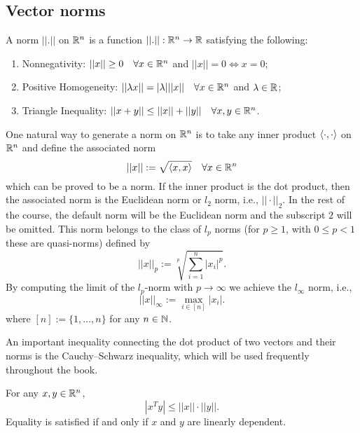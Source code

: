 \documentclass[10pt,a4paper]{article}
\begin{document}
\subsection{Vector norms}
\begin{definition}
	A norm $||.||$ on $\mathbb{R}^n$ is a function $||.||:\mathbb{R}^n \to \mathbb{R}$ satisfying the following:
	\begin{enumerate}
		\item Nonnegativity: $||x|| \geq 0 \quad \forall x \in \mathbb{R}^n$ and $||x|| = 0 \Leftrightarrow x =0$;
		\item Positive Homogeneity:  $||\lambda x|| = |\lambda| ||x|| \quad \forall x \in \mathbb{R}^n$ and $\lambda\in \mathbb{R}$;
		\item Triangle Inequality: $||x+y|| \leq ||x|| + ||y|| \quad \forall x,y \in \mathbb{R}^n$.
	\end{enumerate}
\end{definition}
One natural way to generate a norm on $\mathbb{R}^n$ is to take any inner product $\langle \cdot, \cdot \rangle$ on $\mathbb{R}^n$ and define the associated norm
\begin{equation*}
	||x||:= \sqrt{\langle x, x \rangle} \quad \forall x \in \mathbb{R}^n
\end{equation*}
which can be proved to be a norm. If the inner product is the dot product, then the associated norm is the Euclidean norm or $l_2$ norm, i.e., $||\cdot||_2$. In the rest of the course, the default norm will be the Euclidean norm and the subscript $2$ will be omitted. This norm belongs to the class of $l_p$ norms (for $p\geq 1$, with $0\leq p<1$ these are quasi-norms) defined by 
\begin{equation*}
	||x||_p:= \sqrt[p]{\sum_{i=1}^{n}|x_i|^p}.
\end{equation*}
By computing the limit of the $l_p$-norm with $p\to\infty$ we achieve the $l_{\infty}$ norm, i.e.,
\begin{equation*}
	||x||_{\infty} := \max_{i\in[n]} |x_i|.
\end{equation*}
where $[n]:=\{1, \dots,n\}$ for any $n \in \mathbb{N}$.
\par An important inequality connecting the dot product of two vectors and their norms is the Cauchy–Schwarz inequality, which will be used frequently throughout the book.
\begin{lemma}
	For any $x,y \in \mathbb{R}^n$,
	\begin{equation*}
		|x^Ty| \leq ||x||\cdot||y||.
	\end{equation*}
Equality is satisfied if and only if $x$ and $y$ are linearly dependent.
\end{lemma}
\end{document}
